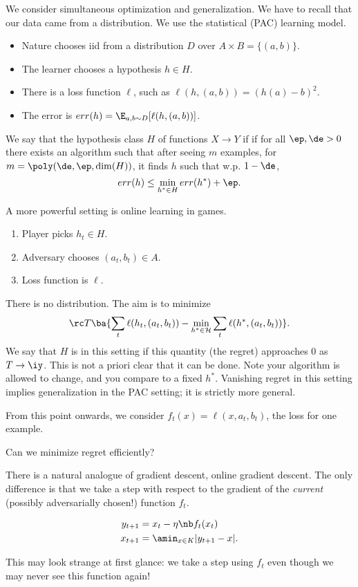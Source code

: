 We consider simultaneous optimization and generalization. We have to recall that our data came from a distribution.
We use the statistical (PAC) learning model. 
\begin{itemize}
\item
Nature chooses iid from a distribution $D$ over $A\times B=\{(a,b)\}$. 
\item
The learner chooses a hypothesis $h\in H$.
\item
There is a loss function $\ell$, such as $\ell(h,(a,b))=(h(a)-b)^2$.
\item
The error is $err(h) = \E_{a,b\sim D}[\ell(h,(a,b))]$.
\end{itemize}
\begin{df}
We say that the hypothesis class $H$ of functions $X\to Y$ if  if for all $\ep,\de>0$ there exists an algorithm such that after seeing $m$ examples, for $m=\poly(\de,\ep,\dim(H))$, it finds $h$ such that w.p. $1-\de$,
$$
err(h) \le \min_{h^*\in H}err(h^*)+\ep.
$$\end{df}


A more powerful setting is online learning in games.
\begin{enumerate}
\item
Player picks $h_t\in H$.
\item
Adversary chooses $(a_t,b_t)\in A$.
\item
Loss function is $\ell$.
\end{enumerate}
There is no distribution. The aim is to minimize 
$$
\rc T \ba{\sum_t \ell(h_t,(a_t,b_t)) - \min_{h^*\in \cal H} \sum_t \ell(h^*, (a_t,b_t))}.
$$
We say that $H$ is  in this setting if this quantity (the regret) approaches 0 as $T\to \iy$.
This is not a priori clear that it can be done. Note your algorithm is allowed to change, and you compare to a fixed $h^*$. Vanishing regret in this setting implies generalization in the PAC setting; it is strictly more general.%

From this point onwards, we consider $f_t(x) = \ell(x,a_t,b_t)$, the loss for one example.

Can we minimize regret efficiently?

There is a natural analogue of gradient descent, online gradient descent. The only difference is that we take a step with respect to the gradient of the \emph{current} (possibly adversarially chosen!) function $f_t$.
\begin{alg}
\begin{align}
y_{t+1} &=x_t - \eta\nb f_t(x_t)\\
x_{t+1} &=\amin_{x\in K}|y_{t+1}-x|.
\end{align}
\end{alg}
This may look strange at first glance: we take a step using $f_t$ even though we may never see this function again!

